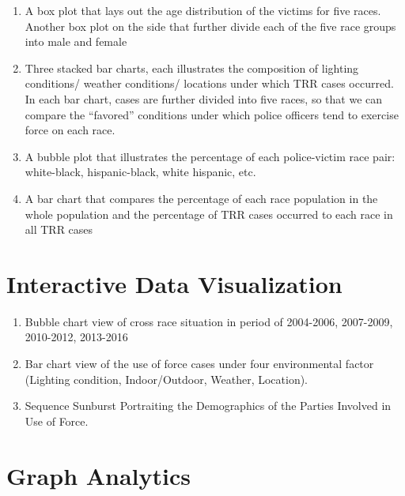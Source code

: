 \documentclass[10pt]{article}
\begin{document}
\begin{enumerate}

\item A box plot that lays out the age distribution of the victims for five races. Another box plot on the side that further divide each of the five race groups into male and female

\item Three stacked bar charts, each illustrates the composition of lighting conditions/ weather conditions/ locations under which TRR cases occurred. In each bar chart, cases are further divided into five races, so that we can compare the “favored” conditions under which police officers tend to exercise force on each race.

\item A bubble plot that illustrates the percentage of each police-victim race pair: white-black, hispanic-black, white hispanic, etc.

\item A bar chart that compares the percentage of each race population in the whole population and the percentage of TRR cases occurred to each race in all TRR cases

\end{enumerate}



\section{Interactive Data Visualization}

\begin{enumerate}

\item Bubble chart view of cross race situation in period of 2004-2006, 2007-2009, 2010-2012, 2013-2016

\item Bar chart view of the use of force cases under four environmental factor (Lighting condition, Indoor/Outdoor, Weather, Location).

\item Sequence Sunburst Portraiting the Demographics of the Parties Involved in Use of Force.

\end{enumerate}




\section{Graph Analytics}
\end{document}
